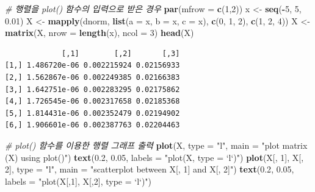 \documentclass[
  11pt,
]{krantz}
\newenvironment{Shaded}{\begin{snugshade}}{\end{snugshade}}
\newcommand{\CommentTok}[1]{\textcolor[rgb]{0.37,0.37,0.37}{\textit{#1}}}
\newcommand{\DataTypeTok}[1]{\textcolor[rgb]{0.27,0.27,0.27}{#1}}
\newcommand{\DecValTok}[1]{\textcolor[rgb]{0.06,0.06,0.06}{#1}}
\newcommand{\FloatTok}[1]{\textcolor[rgb]{0.06,0.06,0.06}{#1}}
\newcommand{\KeywordTok}[1]{\textcolor[rgb]{0.27,0.27,0.27}{\textbf{#1}}}
\newcommand{\NormalTok}[1]{#1}
\newcommand{\OperatorTok}[1]{\textcolor[rgb]{0.43,0.43,0.43}{\textbf{#1}}}
\newcommand{\StringTok}[1]{\textcolor[rgb]{0.5,0.5,0.5}{#1}}
\begin{document}
\begin{Shaded}
\begin{Highlighting}[]
\CommentTok{# 행렬을 plot() 함수의 입력으로 받은 경우}
\KeywordTok{par}\NormalTok{(}\DataTypeTok{mfrow =} \KeywordTok{c}\NormalTok{(}\DecValTok{1}\NormalTok{,}\DecValTok{2}\NormalTok{))}
\NormalTok{x <-}\StringTok{ }\KeywordTok{seq}\NormalTok{(}\OperatorTok{-}\DecValTok{5}\NormalTok{, }\DecValTok{5}\NormalTok{, }\FloatTok{0.01}\NormalTok{)}
\NormalTok{X <-}\StringTok{ }\KeywordTok{mapply}\NormalTok{(dnorm, }
            \KeywordTok{list}\NormalTok{(}\DataTypeTok{a =}\NormalTok{ x, }\DataTypeTok{b =}\NormalTok{ x, }\DataTypeTok{c =}\NormalTok{ x), }
            \KeywordTok{c}\NormalTok{(}\DecValTok{0}\NormalTok{, }\DecValTok{1}\NormalTok{, }\DecValTok{2}\NormalTok{), }
            \KeywordTok{c}\NormalTok{(}\DecValTok{1}\NormalTok{, }\DecValTok{2}\NormalTok{, }\DecValTok{4}\NormalTok{))}
\NormalTok{X <-}\StringTok{ }\KeywordTok{matrix}\NormalTok{(X, }\DataTypeTok{nrow =} \KeywordTok{length}\NormalTok{(x), }\DataTypeTok{ncol =} \DecValTok{3}\NormalTok{)}
\KeywordTok{head}\NormalTok{(X)}
\end{Highlighting}
\end{Shaded}

\begin{verbatim}
             [,1]        [,2]       [,3]
[1,] 1.486720e-06 0.002215924 0.02156933
[2,] 1.562867e-06 0.002249385 0.02166383
[3,] 1.642751e-06 0.002283295 0.02175862
[4,] 1.726545e-06 0.002317658 0.02185368
[5,] 1.814431e-06 0.002352479 0.02194902
[6,] 1.906601e-06 0.002387763 0.02204463
\end{verbatim}

\begin{Shaded}
\begin{Highlighting}[]
\CommentTok{# plot() 함수를 이용한 행렬 그래프 출력}
\KeywordTok{plot}\NormalTok{(X, }\DataTypeTok{type =} \StringTok{"l"}\NormalTok{, }\DataTypeTok{main =} \StringTok{"plot matrix (X) using plot()"}\NormalTok{)}
\KeywordTok{text}\NormalTok{(}\FloatTok{0.2}\NormalTok{, }\FloatTok{0.05}\NormalTok{, }\DataTypeTok{labels =} \StringTok{"plot(X, type = `l`)"}\NormalTok{)}
\KeywordTok{plot}\NormalTok{(X[, }\DecValTok{1}\NormalTok{], X[, }\DecValTok{2}\NormalTok{], }\DataTypeTok{type =} \StringTok{"l"}\NormalTok{, }
     \DataTypeTok{main =} \StringTok{"scatterplot between X[, 1] and X[, 2]"}\NormalTok{)}
\KeywordTok{text}\NormalTok{(}\FloatTok{0.2}\NormalTok{, }\FloatTok{0.05}\NormalTok{, }\DataTypeTok{labels =} \StringTok{"plot(X[,1], X[,2], type = `l`)"}\NormalTok{)}
\end{Highlighting}
\end{Shaded}
\end{document}
